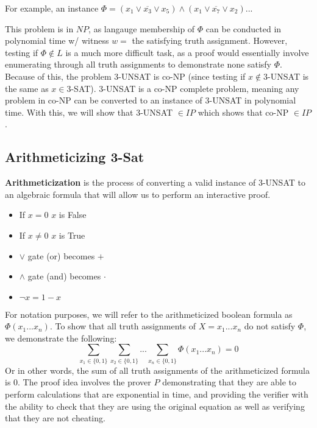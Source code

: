 \documentclass[11pt]{article}
\begin{document}
For example, an instance $\Phi = (x_1 \lor \overline{x_3} \lor x_5) \land (x_1 \lor \overline{x_7} \lor x_2) ...$
\vspace{1em}

This problem is in $NP$, as langauge membership of $\Phi$ can be conducted in polynomial time w/ witness $w =$ the satisfying truth assignment. However, testing if $\Phi \notin L$ is a much more difficult task, as a proof would essentially involve enumerating through all truth assignments to demonstrate none satisfy $\Phi$. Because of this, the problem $3$-UNSAT is co-NP (since testing if $x \notin 3$-UNSAT is the same as $x \in 3$-SAT). 3-UNSAT is a co-NP complete problem, meaning any problem in co-NP can be converted to an instance of 3-UNSAT in polynomial time. With this, we will show that 3-UNSAT $\in IP$ which shows that co-NP $\in IP$.

\subsection{Arithmeticizing 3-Sat}
\textbf{Arithmeticization} is the process of converting a valid instance of 3-UNSAT to an algebraic formula that will allow us to perform an interactive proof.
\begin{itemize}
\item If $x = 0$ $x$ is False
\item If $x \neq 0$ $x$ is True
\item $\lor$ gate (or) becomes $+$
\item $\land$ gate (and) becomes $\cdot$
\item $\lnot x = 1-x$
\end{itemize}
For notation purposes, we will refer to the arithmeticized boolean formula as $\Phi(x_1...x_n)$. To show that all truth assignments of $X=x_1...x_n$ do not satisfy $\Phi$, we demonstrate the following:
$$\sum\limits_{x_1 \in \{0,1\}}\sum\limits_{x_2 \in \{0,1\}}...\sum\limits_{x_n \in \{0,1\}} \Phi(x_1...x_n) = 0$$
Or in other words, the sum of all truth assignments of the arithmeticized formula is 0. The proof idea involves the prover $P$ demonstrating that they are able to perform calculations that are exponential in time, and providing the verifier with the ability to check that they are using the original equation as well as verifying that they are not cheating.
\vspace{1em}
\end{document}
